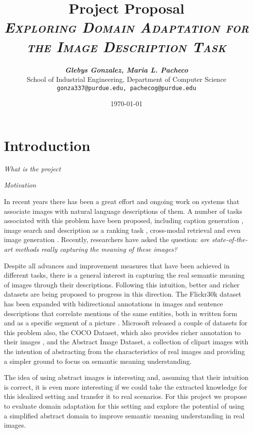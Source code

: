 \documentclass[11pt]{article}
\title{
\textbf{Project Proposal} \\ \textsc{\textit{Exploring Domain Adaptation for the Image Description Task}} \\
}
\author{
	\textbf{\textit{Glebys Gonzalez, Maria L. Pacheco}} \\
	School of Industrial Engineering, Department of Computer Science\\
	\texttt{gonza337@purdue.edu, pachecog@purdue.edu}
}
\date{\today}
\begin{document}
\maketitle


\section{Introduction}

\textit{What is the project}

\textit{Motivation}

In recent years there has been a great effort and ongoing work on systems that associate images with natural language descriptions of them. A number of tasks associated with this problem have been proposed, including caption generation \cite{CMUMicrosoft2015} \cite{MontrealToronto2015} \cite{Stanford2015}, image search and description as a ranking task \cite{HockenmeierTask}, cross-modal retrieval \cite{UCSDCrossModal} and even image generation \cite{CRFImage}. Recently, researchers have asked the question: \textit{are state-of-the-art methods really capturing the meaning of these images?}

Despite all advances and improvement measures that have been achieved in different tasks, there is a general interest in capturing the real semantic meaning of images through their descriptions. Following this intuition, better and richer datasets are being proposed to progress in this direction. The Flickr30k dataset has been expanded with bidirectional annotations in images and sentence descriptions that correlate mentions of the same entities, both in written form and as a specific segment of a picture \cite{Flickr30Ent}. Microsoft released a couple of datasets for this problem also, the COCO Dataset, which also provides richer annotation to their images \cite{MsCOCO}, and the Abstract Image Dataset, a collection of clipart images with the intention of abstracting from the characteristics of real images and providing a simpler ground to focus on semantic meaning understanding. 

The idea of using abstract images is interesting and, assuming that their intuition is correct, it is even more interesting if we could take the extracted knowledge for this idealized setting and transfer it to real scenarios. For this project we propose to evaluate domain adaptation for this setting and explore the potential of using a simplified abstract domain to improve semantic meaning understanding in real images.
\end{document}
